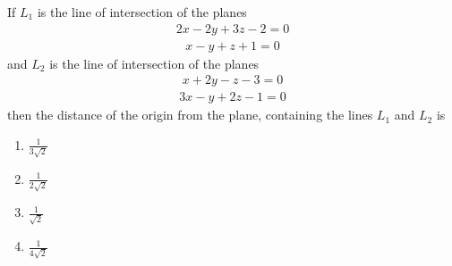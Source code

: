 \item If $L_1$ is the line of intersection of the planes
\begin{align*}
2x - 2y + 3z - 2 = 0
\end{align*}
\begin{align*}
x - y + z + 1 = 0
\end{align*}
and $L_2$ is the line of intersection of the planes
\begin{align*}
x + 2y - z - 3 = 0
\end{align*}
\begin{align*}
3x -y + 2z - 1 = 0
\end{align*}
then the distance of the origin from the plane, containing the lines $L_1$ and $L_2$ is
\begin{enumerate}
\item $\frac{1}{3\sqrt{2}}$
\item $\frac{1}{2\sqrt{2}}$
\item $\frac{1}{\sqrt{2}}$
\item $\frac{1}{4\sqrt{2}}$
\end{enumerate}






































